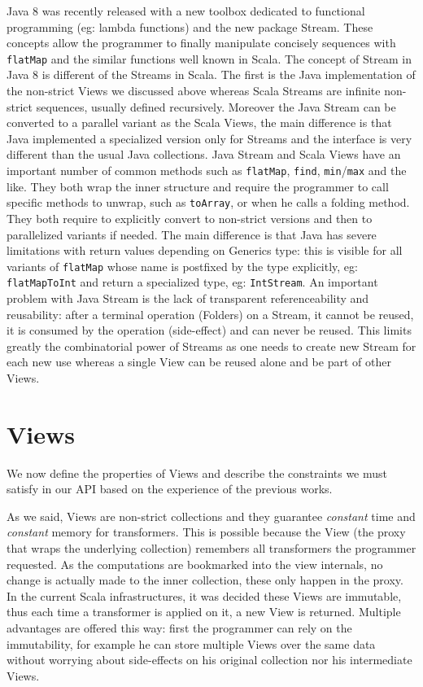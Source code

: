 \documentclass[a4paper,12pt,twocolumn]{article}
\begin{document}
Java 8 was recently released with a new toolbox dedicated to functional programming (eg: lambda functions) and the new package Stream.
These concepts allow the programmer to finally manipulate concisely sequences with \verb|flatMap| and the similar functions well known in Scala.
The concept of Stream in Java 8 is different of the Streams in Scala.
The first is the Java implementation of the non-strict Views we discussed above whereas Scala Streams are infinite non-strict sequences, usually defined recursively.
Moreover the Java Stream can be converted to a parallel variant as the Scala Views, the main difference is that Java implemented a specialized version only for Streams and the interface is very different than the usual Java collections.
Java Stream and Scala Views have an important number of common methods such as \verb|flatMap|, \verb|find|, \verb|min|/\verb|max| and the like.
They both wrap the inner structure and require the programmer to call specific methods to unwrap, such as \verb|toArray|, or when he calls a folding method.
They both require to explicitly convert to non-strict versions and then to parallelized variants if needed.
The main difference is that Java has severe limitations with return values depending on Generics type: this is visible for all variants of \verb|flatMap| whose name is postfixed by the type explicitly, eg: \verb|flatMapToInt| and return a specialized type, eg: \verb|IntStream|.
An important problem with Java Stream is the lack of transparent referenceability and reusability: after a terminal operation (Folders) on a Stream, it cannot be reused, it is consumed by the operation (side-effect) and can never be reused.
This limits greatly the combinatorial power of Streams as one needs to create new Stream for each new use whereas a single View can be reused alone and be part of other Views.

\section{Views}
We now define the properties of Views and describe the constraints we must satisfy in our API based on the experience of the previous works.

As we said, Views are non-strict collections and they guarantee {\it constant} time and {\it constant} memory for transformers.
This is possible because the View (the proxy that wraps the underlying collection) remembers all transformers the programmer requested.
As the computations are bookmarked into the view internals, no change is actually made to the inner collection, these only happen in the proxy.
In the current Scala infrastructures, it was decided these Views are immutable, thus each time a transformer is applied on it, a new View is returned.
Multiple advantages are offered this way: first the programmer can rely on the immutability, for example he can store multiple Views over the same data without worrying about side-effects on his original collection nor his intermediate Views.
\end{document}
